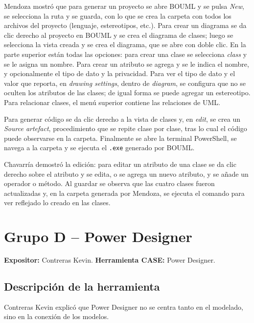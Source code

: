 \documentclass[journal,onecolumn]{IEEEtran}
\begin{document}
	Mendoza mostró que para generar un proyecto se abre BOUML y se pulsa \textit{New}, se selecciona la ruta y se guarda, con lo que se crea la carpeta con todos los archivos del proyecto (lenguaje, estereotipos, etc.). Para crear un diagrama se da clic derecho al proyecto en BOUML y se crea el diagrama de clases; luego se selecciona la vista creada y se crea el diagrama, que se abre con doble clic. En la parte superior están todas las opciones: para crear una clase se selecciona \textit{class} y se le asigna un nombre. Para crear un atributo se agrega y se le indica el nombre, y opcionalmente el tipo de dato y la privacidad. Para ver el tipo de dato y el valor que reporta, en \textit{drawing settings}, dentro de \textit{diagram}, se configura que no se oculten los atributos de las clases; de igual forma se puede agregar un estereotipo. Para relacionar clases, el menú superior contiene las relaciones de UML.
	
	Para generar código se da clic derecho a la vista de clases y, en \textit{edit}, se crea un \textit{Source artefact}, procedimiento que se repite clase por clase, tras lo cual el código puede observarse en la carpeta. Finalmente se abre la terminal PowerShell, se navega a la carpeta y se ejecuta el \texttt{.exe} generado por BOUML.
	
	Chavarría demostró la edición: para editar un atributo de una clase se da clic derecho sobre el atributo y se edita, o se agrega un nuevo atributo, y se añade un operador o método. Al guardar se observa que las cuatro clases fueron actualizadas y, en la carpeta generada por Mendoza, se ejecuta el comando para ver reflejado lo creado en las clases.
	
	\section{Grupo D -- Power Designer}
	
	\textbf{Expositor:} Contreras Kevin. \quad \textbf{Herramienta CASE:} Power Designer.
	
	\subsection{Descripción de la herramienta}
	
	Contreras Kevin explicó que Power Designer no se centra tanto en el modelado, sino en la conexión de los modelos.
	
\end{document}
